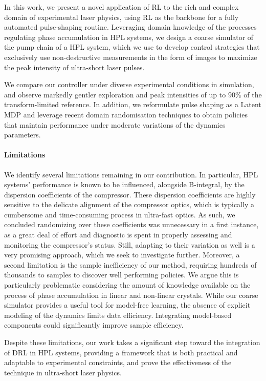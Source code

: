 In this work, we present a novel application of RL to the rich and complex domain of experimental laser physics, using RL as the backbone for a fully automated pulse-shaping routine. Leveraging domain knowledge of the processes regulating phase accumulation in HPL systems, we design a coarse simulator of the pump chain of a HPL system, which we use to develop control strategies that exclusively use non-destructive measurements in the form of images to maximize the peak intensity of ultra-short laser pulses.

We compare our controller under diverse experimental conditions in simulation, and observe markedly gentler exploration and peak intensities of up to $90\%$ of the transform-limited reference. In addition, we reformulate pulse shaping as a Latent MDP and leverage recent domain randomisation techniques to obtain policies that maintain performance under moderate variations of the dynamics parameters.

\paragraph{Limitations}
We identify several limitations remaining in our contribution. In particular, HPL systems' performance is known to be influenced, alongside B-integral, by the dispersion coefficients of the compressor. These dispersion coefficients are highly sensitive to the delicate alignment of the compressor optics, which is typically a cumbersome and time-consuming process in ultra-fast optics. As such, we concluded randomizing over these coefficients was unnecessary in a first instance, as a great deal of effort and diagnostic is spent in properly assessing and monitoring the compressor's status. Still, adapting to their variation as well is a very promising approach, which we seek to investigate further. Moreover, a second limitation is the sample inefficiency of our method, requiring hundreds of thousands to samples to discover well performing policies. We argue this is particularly problematic considering the amount of knowledge available on the process of phase accumulation in linear and non-linear crystals. While our coarse simulator provides a useful tool for model-free learning, the absence of explicit modeling of the dynamics limits data efficiency. Integrating model-based components could significantly improve sample efficiency.

Despite these limitations, our work takes a significant step toward the integration of DRL in HPL systems, providing a framework that is both practical and adaptable to experimental constraints, and prove the effectiveness of the technique in ultra-short laser physics.
